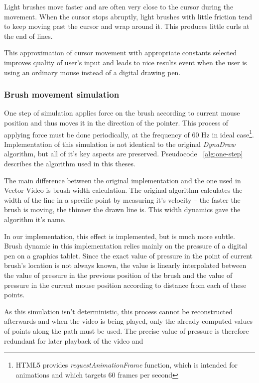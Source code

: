 Light brushes move faster and are often very close to the cursor during the movement. When the cursor stops abruptly, light brushes with little friction tend to keep moving past the cursor and wrap around it. This produces little curls at the end of lines.

This approximation of cursor movement with appropriate constants selected improves quality of user's input and leads to nice results event when the user is using an ordinary mouse instead of a digital drawing pen.

\subsubsection*{Brush movement simulation}

One step of simulation applies force on the brush according to current mouse position and thus moves it in the direction of the pointer. This process of applying force must be  done periodically, at the frequency of 60 Hz in ideal case\footnote{HTML5 provides \textit\textit{requestAnimationFrame} function, which is intended for animations and which targets 60 frames per second}. Implementation of this simulation is not identical to the original \textit{DynaDraw} algorithm, but all of it's key aspects are preserved. Pseudocode ~\ref{alg:one-step} describes the algorithm used in this theses.

The main difference between the original implementation and the one used in Vector Video is brush width calculation. The original algorithm calculates the width of the line in a specific point by measuring it's velocity -- the faster the brush is moving, the thinner the drawn line is. This width dynamics gave the algorithm it's name.

In our implementation, this effect is implemented, but is much more subtle. Brush dynamic in this implementation relies mainly on the pressure of a digital pen on a graphics tablet. Since the exact value of pressure in the point of current brush's location is not always known, the value is linearly interpolated between the value of pressure in the previous position of the brush and the value of pressure in the current mouse position according to distance from each of these points.

As this simulation isn't deterministic, this process cannot be reconstructed afterwards and when the video is being played, only the already computed values of points along the path must be used. The precise value of pressure is therefore redundant for later playback of the video and 

